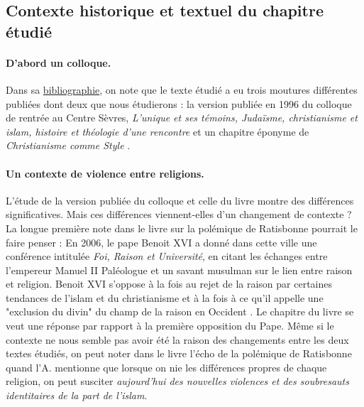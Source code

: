 \subsection{Contexte historique et textuel du chapitre étudié}


\paragraph{D'abord un colloque.} Dans sa \href{https://centresevres.com/content/uploads/2017/07/bibliographie-complete-de-christoph-theobald-sj-2021.pdf}{bibliographie}, on note que le texte étudié a eu trois moutures différentes publiées dont deux que nous étudierons : la version publiée en 1996 du colloque de rentrée au Centre Sèvres, \textit{L'unique et ses témoins, Judaïsme, christianisme et islam, histoire et théologie d'une rencontre }\cite{centre_sevres_paris_unique_1996} et un chapitre éponyme de \textit{Christianisme comme Style} \cite{theobald_christianisme_2007}. 


 \paragraph{Un contexte de violence entre religions.}

L'étude de la version publiée du colloque \cite{centre_sevres_paris_unique_1996} et celle du livre \cite{theobald_christianisme_2007} montre des différences significatives. Mais ces différences viennent-elles d'un changement de contexte ? La longue première note dans le livre sur la polémique de Ratisbonne pourrait le faire penser : En 2006, le pape Benoit XVI a donné dans cette ville une conférence intitulée \textit{Foi, Raison et Université}, en citant les échanges entre l’empereur  Manuel II Paléologue et un savant musulman sur le lien entre raison et religion. Benoit XVI s'oppose à la fois au rejet de la raison par certaines tendances de l'islam et  du christianisme et à la fois à ce qu'il appelle une "exclusion du divin" du champ de la raison en Occident \cite[p.782, note 1]{theobald_christianisme_2007}. Le chapitre du livre se veut une réponse par rapport à la première opposition du Pape.
Même si le contexte ne nous semble pas avoir été la raison des changements entre les deux textes étudiés, on peut noter dans le livre l'écho de la polémique de Ratisbonne quand l'A. mentionne que lorsque on nie les différences propres de chaque religion, on peut susciter \textit{ aujourd'hui des nouvelles violences et des soubresauts identitaires de la part de l'islam}.\cite[p. 787]{theobald_christianisme_2007}
\begin{comment}
    raison historique émerge au sein même du prophétisme biblique sous la forme d'une capacipté éthique d'apprentissage qui n'a pas le droit de dénioer a priori à l'un des interlocuteurs.

    
Cependant, la référence à la violence entre religions, contre-témoignage, ne semble pas faire directement référence à la vague de violence que connut le monde musulman à la suite de cette polémique, l'article du colloque en faisant aussi son point de départ.
\end{comment}

